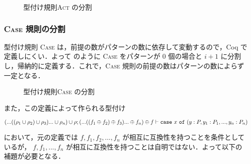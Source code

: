 \begin{figure}[t]
  \vspace{14pt}
  \vspace{14pt}
  \vspace{14pt}

  \caption{型付け規則\textsc{Act} の分割}
  \label{coq:act}
\end{figure}


\subsubsection{\textsc{Case} 規則の分割}

型付け規則 \textsc{Case} は，前提の数がパターンの数に依存して変動するので，Coq で定義しにくい．よって  のように \textsc{Case} をパターンが $0$ 個の場合と $i + 1$ に分割し，帰納的に定義する．これで，\textsc{Case} 規則の前提の数はパターンの数によらず一定となる．


\begin{figure}[t]
  \vspace{14pt}

  \caption{型付け規則\textsc{Case} の分割}
  \label{api:case_split}
\end{figure}


また，この定義によって作られる型付け
\begin{center}
  $(...((\rho_1 \cup \rho_2) \cup \rho_3)... \cup \rho_n) \cup \rho ; (...((f_1 \oplus f_2) \oplus f_3)... \oplus f_n) \oplus f \vdash {\tt case} \ x \ {\tt of} \ (y : P, y_1 : P_1, ..., y_n : P_n)$
\end{center}
において，元の定義では $f, f_1, f_2, ..., f_n$ が相互に互換性を持つことを条件としているが，
$f, f_1, ..., f_n$ が相互に互換性を持つことは自明ではない．よって以下の補題が必要となる．

